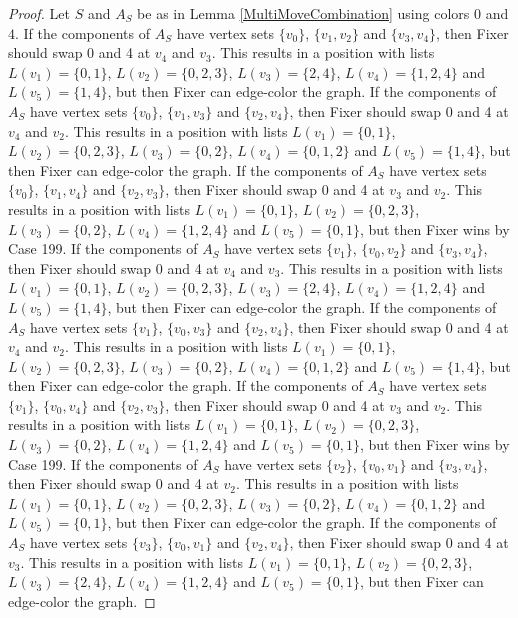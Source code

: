 \documentclass[12pt]{amsart}
\theoremstyle{plain}
\theoremstyle{definition}
\theoremstyle{remark}
\begin{document}
\begin{proof}
Let $S$ and $A_S$ be as in Lemma \ref{MultiMoveCombination} using colors $0$ and $4$. If the components of $A_S$ have vertex sets $\{v_0\}$, $\{v_1, v_2\}$ and $\{v_3, v_4\}$, then Fixer should swap 0 and 4 at $v_4$ and $v_3$. This results in a position with lists $L(v_1) = \{0, 1\}$, $L(v_2) = \{0, 2, 3\}$, $L(v_3) = \{2, 4\}$, $L(v_4) = \{1, 2, 4\}$ and $L(v_5) = \{1, 4\}$, but then Fixer can edge-color the graph.
If the components of $A_S$ have vertex sets $\{v_0\}$, $\{v_1, v_3\}$ and $\{v_2, v_4\}$, then Fixer should swap 0 and 4 at $v_4$ and $v_2$. This results in a position with lists $L(v_1) = \{0, 1\}$, $L(v_2) = \{0, 2, 3\}$, $L(v_3) = \{0, 2\}$, $L(v_4) = \{0, 1, 2\}$ and $L(v_5) = \{1, 4\}$, but then Fixer can edge-color the graph.
If the components of $A_S$ have vertex sets $\{v_0\}$, $\{v_1, v_4\}$ and $\{v_2, v_3\}$, then Fixer should swap 0 and 4 at $v_3$ and $v_2$. This results in a position with lists $L(v_1) = \{0, 1\}$, $L(v_2) = \{0, 2, 3\}$, $L(v_3) = \{0, 2\}$, $L(v_4) = \{1, 2, 4\}$ and $L(v_5) = \{0, 1\}$, but then Fixer wins by Case 199.
If the components of $A_S$ have vertex sets $\{v_1\}$, $\{v_0, v_2\}$ and $\{v_3, v_4\}$, then Fixer should swap 0 and 4 at $v_4$ and $v_3$. This results in a position with lists $L(v_1) = \{0, 1\}$, $L(v_2) = \{0, 2, 3\}$, $L(v_3) = \{2, 4\}$, $L(v_4) = \{1, 2, 4\}$ and $L(v_5) = \{1, 4\}$, but then Fixer can edge-color the graph.
If the components of $A_S$ have vertex sets $\{v_1\}$, $\{v_0, v_3\}$ and $\{v_2, v_4\}$, then Fixer should swap 0 and 4 at $v_4$ and $v_2$. This results in a position with lists $L(v_1) = \{0, 1\}$, $L(v_2) = \{0, 2, 3\}$, $L(v_3) = \{0, 2\}$, $L(v_4) = \{0, 1, 2\}$ and $L(v_5) = \{1, 4\}$, but then Fixer can edge-color the graph.
If the components of $A_S$ have vertex sets $\{v_1\}$, $\{v_0, v_4\}$ and $\{v_2, v_3\}$, then Fixer should swap 0 and 4 at $v_3$ and $v_2$. This results in a position with lists $L(v_1) = \{0, 1\}$, $L(v_2) = \{0, 2, 3\}$, $L(v_3) = \{0, 2\}$, $L(v_4) = \{1, 2, 4\}$ and $L(v_5) = \{0, 1\}$, but then Fixer wins by Case 199.
If the components of $A_S$ have vertex sets $\{v_2\}$, $\{v_0, v_1\}$ and $\{v_3, v_4\}$, then Fixer should swap 0 and 4 at $v_2$. This results in a position with lists $L(v_1) = \{0, 1\}$, $L(v_2) = \{0, 2, 3\}$, $L(v_3) = \{0, 2\}$, $L(v_4) = \{0, 1, 2\}$ and $L(v_5) = \{0, 1\}$, but then Fixer can edge-color the graph.
If the components of $A_S$ have vertex sets $\{v_3\}$, $\{v_0, v_1\}$ and $\{v_2, v_4\}$, then Fixer should swap 0 and 4 at $v_3$. This results in a position with lists $L(v_1) = \{0, 1\}$, $L(v_2) = \{0, 2, 3\}$, $L(v_3) = \{2, 4\}$, $L(v_4) = \{1, 2, 4\}$ and $L(v_5) = \{0, 1\}$, but then Fixer can edge-color the graph.

\end{proof}
\end{document}

